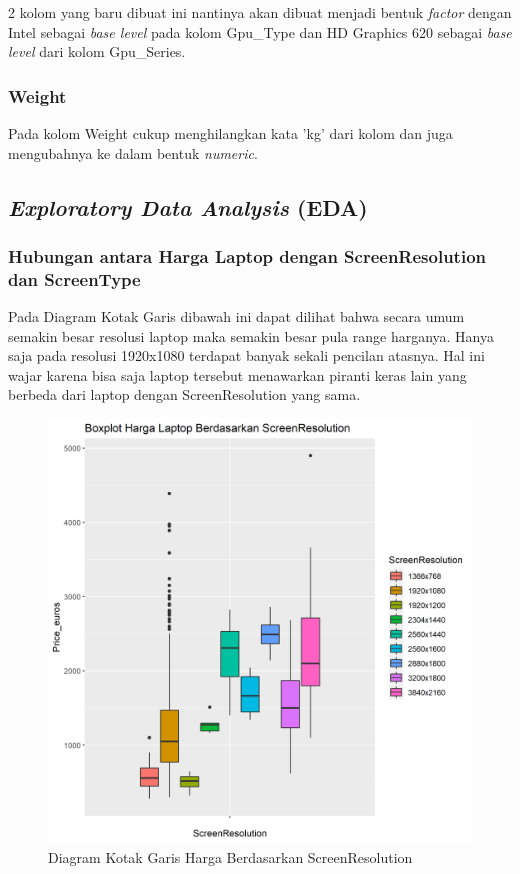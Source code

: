 \documentclass[12pt]{article}
\begin{document}
2 kolom yang baru dibuat ini nantinya akan dibuat menjadi bentuk \textit{factor} dengan Intel sebagai \textit{base level} pada kolom Gpu\_Type dan HD Graphics 620 sebagai \textit{base level} dari kolom Gpu\_Series.
\subsubsection{Weight}
Pada kolom Weight cukup menghilangkan kata 'kg' dari kolom dan juga mengubahnya ke dalam bentuk \textit{numeric}. 
\subsection{\textit{Exploratory Data Analysis} (EDA)}
\subsubsection{Hubungan antara Harga Laptop dengan ScreenResolution dan ScreenType }
Pada Diagram Kotak Garis dibawah ini dapat dilihat bahwa secara umum semakin besar resolusi laptop maka semakin besar pula range harganya. Hanya saja pada resolusi 1920x1080 terdapat banyak sekali pencilan atasnya. Hal ini wajar karena bisa saja laptop tersebut menawarkan piranti keras lain yang berbeda dari laptop dengan ScreenResolution yang sama.   
  
\begin{figure}[h!]
    \centering
    \includegraphics[scale = 0.4]{boxplot_price1.png}
    \caption{Diagram Kotak Garis Harga Berdasarkan ScreenResolution}
    \label{Resol}
\end{figure}  
  
\end{document}
